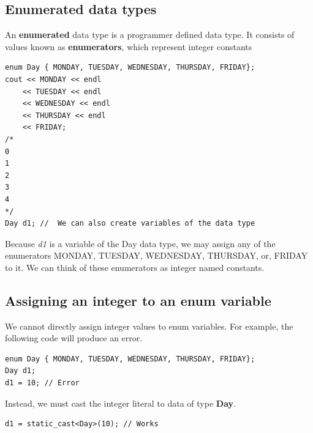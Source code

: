 \documentclass{report}
\begin{document}
	\pagebreak \bigbreak \noindent 
	\subsection{Enumerated data types}
	\bigbreak \noindent 
	\begin{concept}
	   An \textbf{enumerated} data type is a programmer defined data type. It consists of values known as \textbf{enumerators}, which represent integer constants 
	\end{concept}
	\bigbreak \noindent 
	\sepline
	\begin{verbatim}
enum Day { MONDAY, TUESDAY, WEDNESDAY, THURSDAY, FRIDAY};
cout << MONDAY << endl 
    << TUESDAY << endl 
    << WEDNESDAY << endl 
    << THURSDAY << endl 
    << FRIDAY;
/*
0
1
2
3
4
*/
Day d1; //	We can also create variables of the data type
	\end{verbatim}
	\sepline
	\bigbreak \noindent 
    Because \textit{d1} is a variable of the Day data type, we may assign any of the enumerators MONDAY, TUESDAY, WEDNESDAY, THURSDAY, or, FRIDAY to it.
    \bigbreak \noindent 
    We can think of these enumerators as integer named constants.

    \bigbreak \noindent 
    \subsection{Assigning an integer to an enum variable}
    \bigbreak \noindent 
    We cannot directly assign integer values to enum variables. For example, the following code will produce an error.
    \bigbreak \noindent 
    \sepline
    \begin{verbatim}
enum Day { MONDAY, TUESDAY, WEDNESDAY, THURSDAY, FRIDAY};
Day d1;
d1 = 10; // Error
    \end{verbatim}
    \sepline
    \bigbreak \noindent 
    Instead, we must cast the integer literal to data of type \textbf{Day}. 
    \bigbreak \noindent 
    \sepline
    \begin{verbatim}
d1 = static_cast<Day>(10); // Works
    \end{verbatim}
    \sepline

    \pagebreak  \bigbreak \noindent 
\end{document}

